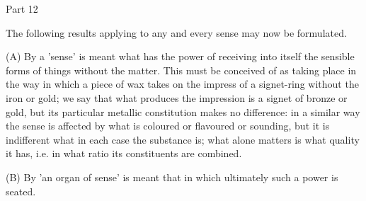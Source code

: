 Part 12

The following results applying to any and every sense may now be formulated.

(A) By a 'sense' is meant what has the power of receiving into itself
the sensible forms of things without the matter. This must be conceived
of as taking place in the way in which a piece of wax takes on the
impress of a signet-ring without the iron or gold; we say that what
produces the impression is a signet of bronze or gold, but its particular
metallic constitution makes no difference: in a similar way the sense
is affected by what is coloured or flavoured or sounding, but it is
indifferent what in each case the substance is; what alone matters
is what quality it has, i.e. in what ratio its constituents are combined.

(B) By 'an organ of sense' is meant that in which ultimately such
a power is seated. 


